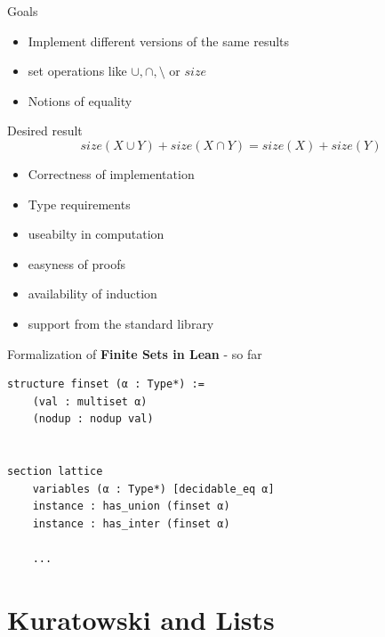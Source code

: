 \documentclass[aspectratio=169]{beamer}
\begin{document}
    \begin{frame}{Goals}
        \begin{itemize}
            \item Implement different versions of the same results
            \item set operations like $\cup, \cap, \setminus$ or $size$
            \item Notions of equality
        \end{itemize}
        Desired result \[size(X \cup Y) + size (X \cap Y) = size(X) + size(Y)\]
        \pause
        \begin{itemize}
            \item Correctness of implementation
            \item Type requirements
            \item useabilty in computation
            \item easyness of proofs
            \item availability of induction
            \item support from the standard library
        \end{itemize}
    
    \end{frame}

    \begin{frame}[fragile]{Formalization of \textbf{Finite Sets in Lean} - so far\cite{leanfinset}}
        \begin{lstlisting}
structure finset (α : Type*) :=
    (val : multiset α)
    (nodup : nodup val)


section lattice
    variables (α : Type*) [decidable_eq α] 
    instance : has_union (finset α) 
    instance : has_inter (finset α)

    ...
        \end{lstlisting}
    \end{frame}
    \section{Kuratowski and Lists}
   
\end{document}
